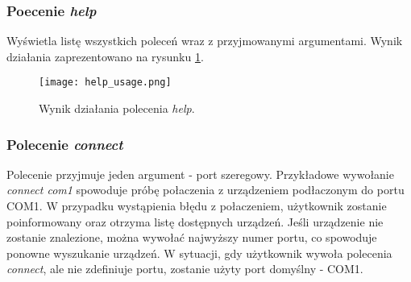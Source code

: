         \subsubsection{Poecenie \textit{help}}
            Wyświetla listę wszystkich poleceń wraz z przyjmowanymi argumentami. 
            Wynik działania zaprezentowano na rysunku \ref{fig:help_output}.
            \begin{figure}[!ht]
                \centering
                \texttt{[image: help\_usage.png]}
                \caption{Wynik działania polecenia \textit{help}.}
                \label{fig:help_output}
            \end{figure}
        \subsubsection{Polecenie \textit{connect}}
            Polecenie przyjmuje jeden argument - port szeregowy. Przykładowe wywołanie \textit{connect com1} 
            spowoduje próbę połaczenia z urządzeniem podłaczonym do portu COM1. W przypadku wystąpienia błędu 
            z połaczeniem, użytkownik zostanie poinformowany oraz otrzyma listę dostępnych urządzeń. 
            Jeśli urządzenie nie zostanie znalezione, można wywołać najwyższy numer portu, co spowoduje 
            ponowne wyszukanie urządzeń. W sytuacji, gdy użytkownik wywoła polecenia \textit{connect}, ale nie 
            zdefiniuje portu, zostanie użyty port domyślny - COM1. 

